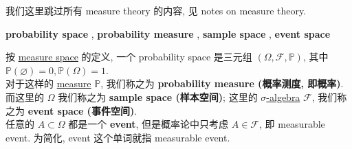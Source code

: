 \documentclass{qlnotes-export}
\begin{document}
我们这里跳过所有 measure theory 的内容, 见 notes on measure theory.\\

\begin{definition}{\protect{}\label{kn-probability-space}{\textbf{probability
space}} ,
\protect{}\label{kn-probability-measure}{\textbf{probability
measure}} ,
\protect{}\label{kn-sample-space}{\textbf{sample space}} ,
\protect{}\label{kn-event-space}{\textbf{event space}}}

按 \href{https://qiulinfan.github.io/notes/math/measure-theory/\#kn-measure-space}{measure space} 的定义, 一个 probability space 是三元组 \((\Omega,\mathcal{F},{\mathbb{P}})\), 其中 \({\mathbb{P}}(\varnothing) = 0,{\mathbb{P}}(\Omega) = 1\).\\
对于这样的 \href{https://qiulinfan.github.io/notes/math/measure-theory/\#kn-measure}{measure} \(\mathbb{P}\), 我们称之为 \textbf{probability measure (概率测度, 即概率)}.\\
而这里的 \(\Omega\) 我们称之为 \textbf{sample space (样本空间)}; 这里的 \href{https://qiulinfan.github.io/notes/math/measure-theory/\#kn-sigma-algebra}{\(\sigma\)-algebra} \(\mathcal{F}\), 我们称之为 \textbf{event space (事件空间)}.\\
任意的 \(A \subset \Omega\) 都是一个 \textbf{event}, 但是概率论中只考虑 \(A \in \mathcal{F}\), 即 measurable event. 为简化, event 这个单词就指 measurable event.

\end{definition}
\end{document}
